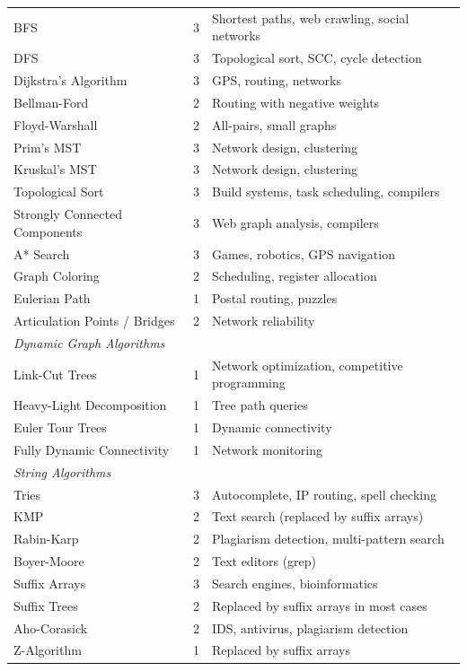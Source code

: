 \begin{center}
\begin{tabular}{lcl}
\midrule
BFS & 3 & Shortest paths, web crawling, social networks \\
DFS & 3 & Topological sort, SCC, cycle detection \\
Dijkstra's Algorithm & 3 & GPS, routing, networks \\
Bellman-Ford & 2 & Routing with negative weights \\
Floyd-Warshall & 2 & All-pairs, small graphs \\
Prim's MST & 3 & Network design, clustering \\
Kruskal's MST & 3 & Network design, clustering \\
Topological Sort & 3 & Build systems, task scheduling, compilers \\
Strongly Connected Components & 3 & Web graph analysis, compilers \\
A* Search & 3 & Games, robotics, GPS navigation \\
Graph Coloring & 2 & Scheduling, register allocation \\
Eulerian Path & 1 & Postal routing, puzzles \\
Articulation Points / Bridges & 2 & Network reliability \\
\midrule
\multicolumn{3}{l}{\textit{Dynamic Graph Algorithms}} \\
\midrule
Link-Cut Trees & 1 & Network optimization, competitive programming \\
Heavy-Light Decomposition & 1 & Tree path queries \\
Euler Tour Trees & 1 & Dynamic connectivity \\
Fully Dynamic Connectivity & 1 & Network monitoring \\
\midrule
\multicolumn{3}{l}{\textit{String Algorithms}} \\
\midrule
Tries & 3 & Autocomplete, IP routing, spell checking \\
KMP & 2 & Text search (replaced by suffix arrays) \\
Rabin-Karp & 2 & Plagiarism detection, multi-pattern search \\
Boyer-Moore & 2 & Text editors (grep) \\
Suffix Arrays & 3 & Search engines, bioinformatics \\
Suffix Trees & 2 & Replaced by suffix arrays in most cases \\
Aho-Corasick & 2 & IDS, antivirus, plagiarism detection \\
Z-Algorithm & 1 & Replaced by suffix arrays \\

\end{tabular}
\end{center}
